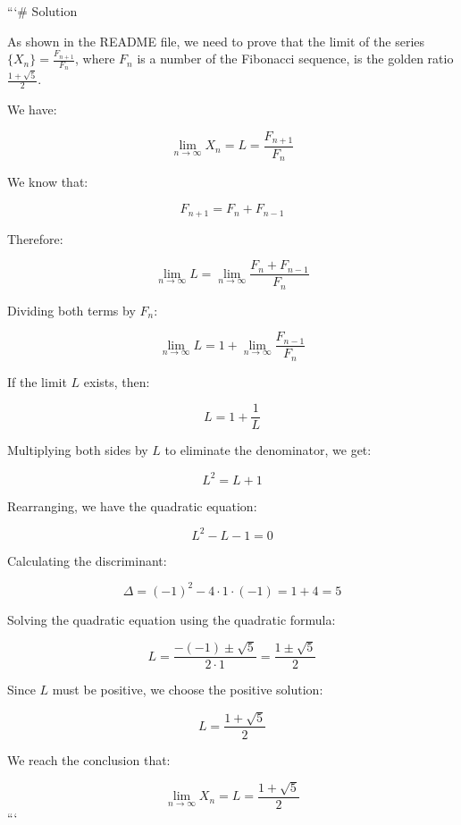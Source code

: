 ```# Solution

As shown in the README file, we need to prove that the limit of the series \( \{X_n\} = \frac{F_{n+1}}{F_n} \), where \( F_n \) is a number of the Fibonacci sequence, is the golden ratio \( \frac{1 + \sqrt{5}}{2} \).

We have:

\[
\lim_{{n \to \infty}} X_n = L = \frac{F_{n+1}}{F_n}
\]

We know that:

\[
F_{n+1} = F_n + F_{n-1}
\]

Therefore:

\[
\lim_{{n \to \infty}} L = \lim_{{n \to \infty}} \frac{F_n + F_{n-1}}{F_n}
\]

Dividing both terms by \( F_n \):

\[
\lim_{{n \to \infty}} L = 1 + \lim_{{n \to \infty}} \frac{F_{n-1}}{F_n}
\]

If the limit \( L \) exists, then:

\[
L = 1 + \frac{1}{L}
\]

Multiplying both sides by \( L \) to eliminate the denominator, we get:

\[
L^2 = L + 1
\]

Rearranging, we have the quadratic equation:

\[
L^2 - L - 1 = 0
\]

Calculating the discriminant:

\[
\Delta = (-1)^2 - 4 \cdot 1 \cdot (-1) = 1 + 4 = 5
\]

Solving the quadratic equation using the quadratic formula:

\[
L = \frac{-(-1) \pm \sqrt{5}}{2 \cdot 1} = \frac{1 \pm \sqrt{5}}{2}
\]

Since \( L \) must be positive, we choose the positive solution:

\[
L = \frac{1 + \sqrt{5}}{2}
\]

We reach the conclusion that:

\[
\lim_{{n \to \infty}} X_n = L = \frac{1 + \sqrt{5}}{2}
\]
```
